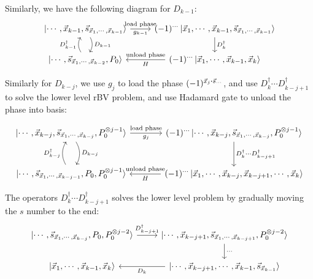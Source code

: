 \documentclass{article}
\begin{document}
Similarly, we have the following diagram for $D_{k-1}$:
\begin{equation}
\begin{tikzcd}
  \ket{\cdots,\vec{x}_{k-1},\vec{s}_{\vec{x}_1,\cdots,\vec{x}_{k-1}}} 
  \arrow[r, "\text{load phase}", "g_{k-1}" below,]
  \dar[bend left, "D_{k-1}"]
  & 
  (-1)^{\cdots} \ket{\vec{x}_1,\cdots,\vec{x}_{k-1},\vec{s}_{\vec{x}_1,\cdots,\vec{x}_{k-1}}}
  \dar["D^\dagger_k"]
  \\
  \ket{\cdots,\vec{s}_{\vec{x}_1,\cdots,\vec{x}_{k-2}},P_0}
  \uar[bend left, "D^\dagger_{k-1}"]
  &
  (-1)^{\cdots} \ket{\vec{x}_1,\cdots,\vec{x}_{k-1},\vec{x}_{k}}
  \lar["\text{unload phase}" above, "H"]
\end{tikzcd}
\end{equation}

Similarly for $D_{k-j}$, we use $g_j$ to load the phase 
$(-1)^{\vec{x}_j\vdot \vec{s}_{\cdots}}$, and use $D^\dagger_k\cdots
D^\dagger_{k-j+1}$ to solve the lower level rBV problem, and use Hadamard gate
to unload the phase into basis:

\begin{equation}
\begin{tikzcd}[row sep=large, column sep = large]
  \ket{\cdots,\vec{x}_{k-j},\vec{s}_{\vec{x}_1,\cdots,\vec{x}_{k-j}},P_0^{\otimes j-1}} 
  \arrow[r, "\text{load phase}", "g_j" below,]
  \dar[bend left, "D_{k-j}"]
  & 
  (-1)^{\cdots} 
  \ket{\cdots,\vec{x}_{k-j},\vec{s}_{\vec{x}_1,\cdots,\vec{x}_{k-j}},P_0^{\otimes j-1}} 
  \dar["D^\dagger_k\cdots D^\dagger_{k-j+1}"]
  \\
  \ket{\cdots,\vec{s}_{\vec{x}_1,\cdots,\vec{x}_{k-j-1}},P_0,P_0^{\otimes j-1}}
  \uar[bend left, "D^\dagger_{k-j}"]
  &
  (-1)^{\cdots} \ket{\vec{x}_1,\cdots,\vec{x}_{k-j}, \vec{x}_{k-j+1},\cdots,\vec{x}_{k}}
  \lar["\text{unload phase}" above, "H"]
\end{tikzcd}
\end{equation}

The operators $D^\dagger_k\cdots D^\dagger_{k-j+1}$ solves the lower level
problem by gradually moving the $s$ number to the end:
\begin{equation}
\begin{tikzcd}
  \ket{\cdots,\vec{s}_{\vec{x}_1,\cdots,\vec{x}_{k-j}},P_0,P_0^{\otimes j-2}}
  \rar["D^\dagger_{k-j+1}"]
  &
  \ket{\cdots,\vec{x}_{k-j+1}, \vec{s}_{\vec{x}_1,\cdots,\vec{x}_{k-j+1}},P_0^{\otimes j-2}}
  \dar["\cdots"]
  \\
  \ket{\vec{x}_1,\cdots,\vec{x}_{k-1},\vec{x}_{k}}
  &
  \ket{\cdots,\vec{x}_{k-j+1},\cdots,\vec{x}_{k-1},\vec{s}_{\vec{x}_{k-1}}}
  \lar["D_k"]
\end{tikzcd}
\end{equation}
\end{document}
